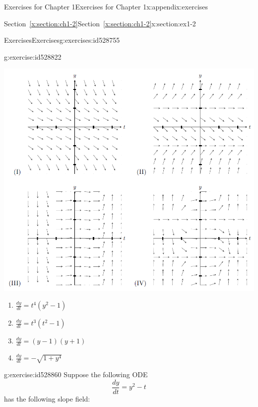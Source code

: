 \documentclass[oneside,10pt,]{book}
\newcommand{\xreffont}{\relax}
\numberwithin{equation}{section}
\numberwithin{equation}{section}
\begin{document}
\begin{appendixptx}{Exercises for Chapter 1}{}{Exercises for Chapter 1}{}{}{x:appendix:exercises}
\begin{sectionptx}{Section~{\xreffont\ref*{x:section:ch1-2}}}{}{Section~{\xreffont\ref*{x:section:ch1-2}}}{}{}{x:section:ex1-2}
\begin{exercises-subsection-numberless}{Exercises}{}{Exercises}{}{}{g:exercises:id528755}
\begin{divisionexercise}{2}{}{}{g:exercise:id528822}
\begin{image}{0}{1}{0}
\includegraphics[width=\linewidth]{images/HWc1s2-4.png}
\end{image}%
%
\begin{enumerate}[label=(\alph*)]
\item{}\(\displaystyle \frac{dy}{dt}=t^4(y^2-1)\)%
\item{}\(\displaystyle \frac{dy}{dt}=t^3(t^2-1)\)%
\item{}\(\displaystyle \frac{dy}{dt}=(y-1)(y+1)\)%
\item{}\(\displaystyle \frac{dy}{dt}=-\sqrt{1+y^4}\)%
\end{enumerate}
%
\end{divisionexercise}%
\begin{divisionexercise}{3}{}{}{g:exercise:id528860}%
Suppose the following ODE%
\begin{equation*}
\frac{dy}{dt}=y^{2}-t
\end{equation*}
has the following slope field:%
\begin{image}{0}{1}{0}%

\end{image}
\end{divisionexercise}
\end{exercises-subsection-numberless}
\end{sectionptx}
\end{appendixptx}
\end{document}
